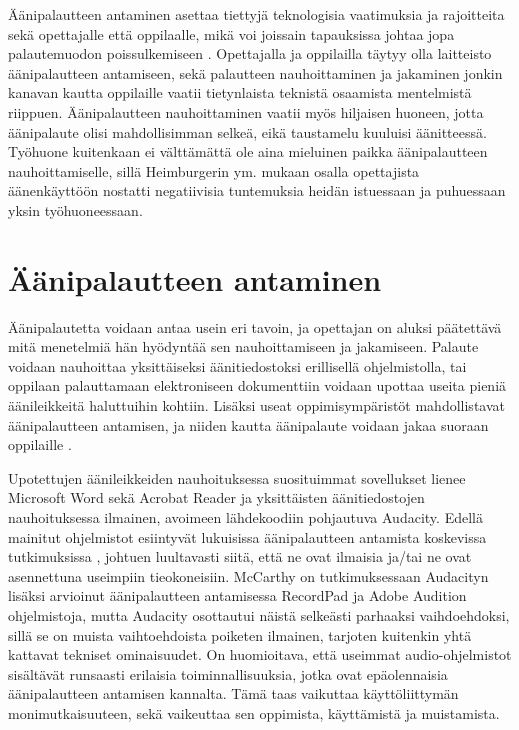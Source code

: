 \documentclass[utf8]{gradu3}
\begin{document}
Äänipalautteen antaminen asettaa tiettyjä teknologisia vaatimuksia ja rajoitteita sekä opettajalle että oppilaalle, mikä voi joissain tapauksissa johtaa jopa palautemuodon poissulkemiseen \parencite[][]{developing}. Opettajalla ja oppilailla täytyy olla laitteisto äänipalautteen antamiseen, sekä palautteen nauhoittaminen ja jakaminen jonkin kanavan kautta oppilaille vaatii tietynlaista teknistä osaamista mentelmistä riippuen. Äänipalautteen nauhoittaminen vaatii myös hiljaisen huoneen, jotta äänipalaute olisi mahdollisimman selkeä, eikä taustamelu kuuluisi äänitteessä. Työhuone kuitenkaan ei välttämättä ole aina mieluinen paikka äänipalautteen nauhoittamiselle, sillä Heimburgerin ym. \parencite[][]{academics} mukaan osalla opettajista äänenkäyttöön nostatti negatiivisia tuntemuksia heidän istuessaan ja puhuessaan yksin työhuoneessaan.  

\section{Äänipalautteen antaminen}

Äänipalautetta voidaan antaa usein eri tavoin, ja opettajan on aluksi päätettävä mitä menetelmiä hän hyödyntää sen nauhoittamiseen ja jakamiseen. Palaute voidaan nauhoittaa yksittäiseksi äänitiedostoksi erillisellä ohjelmistolla, tai oppilaan palauttamaan elektroniseen dokumenttiin voidaan upottaa useita pieniä äänileikkeitä haluttuihin kohtiin. Lisäksi useat oppimisympäristöt mahdollistavat äänipalautteen antamisen, ja niiden kautta äänipalaute voidaan jakaa suoraan oppilaille \parencite[][]{using}. 

Upotettujen äänileikkeiden nauhoituksessa suosituimmat sovellukset lienee Microsoft Word sekä Acrobat Reader ja yksittäisten äänitiedostojen nauhoituksessa ilmainen, avoimeen lähdekoodiin pohjautuva Audacity. Edellä mainitut ohjelmistot esiintyvät lukuisissa äänipalautteen antamista koskevissa tutkimuksissa \parencite[][]{using, ice, principles, evaluating, areYouListening, engaging, academics, attitudes, versus}, johtuen luultavasti siitä, että ne ovat ilmaisia ja/tai ne ovat asennettuna useimpiin tieokoneisiin. McCarthy \parencite[][]{evaluating} on tutkimuksessaan Audacityn lisäksi arvioinut äänipalautteen antamisessa RecordPad ja Adobe Audition ohjelmistoja, mutta Audacity osottautui näistä selkeästi parhaaksi vaihdoehdoksi, sillä se on muista vaihtoehdoista poiketen ilmainen, tarjoten kuitenkin yhtä kattavat tekniset ominaisuudet. On huomioitava, että useimmat audio-ohjelmistot sisältävät runsaasti erilaisia toiminnallisuuksia, jotka ovat epäolennaisia äänipalautteen antamisen kannalta. Tämä taas vaikuttaa käyttöliittymän monimutkaisuuteen, sekä vaikeuttaa sen oppimista, käyttämistä ja muistamista.
\end{document}
